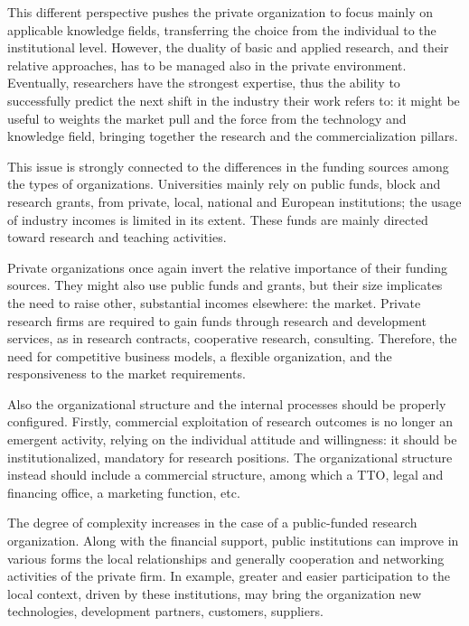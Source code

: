This different perspective pushes the private organization to focus mainly on applicable knowledge fields, transferring the choice from the individual to the institutional level. However, the duality of basic and applied research, and their relative approaches, has to be managed also in the private environment. Eventually, researchers have the strongest expertise, thus the ability to successfully predict the next shift in the industry their work refers to: it might be useful to weights the market pull and the force from the technology and knowledge field, bringing together the research and the commercialization pillars. 

This issue is strongly connected to the differences in the funding sources among the types of organizations. Universities mainly rely on public funds, block and research grants, from private, local, national and European institutions; the usage of industry incomes is limited in its extent. These funds are mainly directed toward research and teaching activities. 

Private organizations once again invert the relative importance of their funding sources. They might also use public funds and grants, but their size implicates the need to raise other, substantial incomes elsewhere: the market. Private research firms are required to gain funds through research and development services, as in research contracts, cooperative research, consulting. Therefore, the need for competitive business models, a flexible organization, and the responsiveness to the market requirements.

Also the organizational structure and the internal processes should be properly configured. Firstly, commercial exploitation of research outcomes is no longer an emergent activity, relying on the individual attitude and willingness: it should be institutionalized, mandatory for research positions. The organizational structure instead should include a commercial structure, among which a TTO, legal and financing office, a marketing function, etc.

The degree of complexity increases in the case of a public-funded research organization. Along with the financial support, public institutions can improve in various forms the local relationships and generally cooperation and networking activities of the private firm. In example, greater and easier participation to the local context, driven by these institutions, may bring the organization new technologies, development partners, customers, suppliers.  

